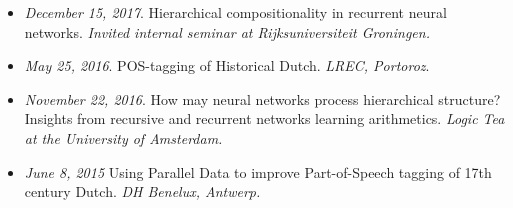 \begin{itemize}
    \item \textit{December 15, 2017}. Hierarchical compositionality in recurrent neural networks. \textit{Invited internal seminar at Rijksuniversiteit Groningen.}
    \item \textit{May 25, 2016}. POS-tagging of Historical Dutch. \textit{LREC, Portoroz}.
    \item \textit{November 22, 2016}. How may neural networks process hierarchical structure? Insights from recursive and recurrent networks learning arithmetics. \textit{Logic Tea at the University of Amsterdam.}
    \item \textit{June 8, 2015} Using Parallel Data to improve Part-of-Speech tagging of 17th century Dutch. \textit{DH Benelux, Antwerp.}
\end{itemize}

